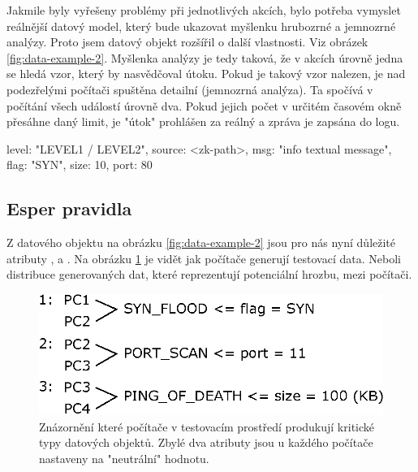 \documentclass[
  digital, %
  table,   %
  nolof,     %
  nolot,     %
  oneside, %
  nocover,
  monochrome,
  12pt
]{fithesis3}
\begin{document}
Jakmile byly vyřešeny problémy při jednotlivých akcích, bylo potřeba vymyslet reálnější datový model, který bude ukazovat myšlenku hrubozrné a jemnozrné analýzy. Proto jsem datový objekt rozšířil o další vlastnosti. Viz obrázek \ref{fig:data-example-2}. Myšlenka analýzy je tedy taková, že v akcích úrovně jedna se hledá vzor, který by nasvědčoval útoku. Pokud je takový vzor nalezen, je nad podezřelými počítači spuštěna detailní (jemnozrná analýza). Ta spočívá v počítání všech událostí úrovně dva. Pokud jejich počet v určitém časovém okně přesáhne daný limit, je "útok" prohlášen za reálný a zpráva je zapsána do logu.

\begin{center}
\begin{minipage}[H]{.65\linewidth}
	\begin{mylisting}
{
	level: "LEVEL1 / LEVEL2",
	source: <zk-path>,
	msg: "info textual message",
	flag: "SYN",
	size: 10,
	port: 80
}
	\end{mylisting}
	\label{fig:data-example-2} 
\end{minipage}
\end{center}

\subsection*{Esper pravidla}
Z datového objektu na obrázku \ref{fig:data-example-2} jsou pro nás nyní důležité atributy ,  a . Na obrázku \ref{fig:pc-data-distribution} je vidět jak počítače generují testovací data. Neboli distribuce generovaných dat, které reprezentují potenciální hrozbu, mezi počítači.

\begin{figure}[H]
	\centering
    \includegraphics[width=.65\linewidth, height=.2\textheight]{images/pc-data-distribution.eps}
    \caption{Znázornění které počítače v testovacím prostředí produkují kritické typy datových objektů. Zbylé dva atributy jsou u každého počítače nastaveny na "neutrální" hodnotu.}
    \label{fig:pc-data-distribution}
\end{figure}
\end{document}
